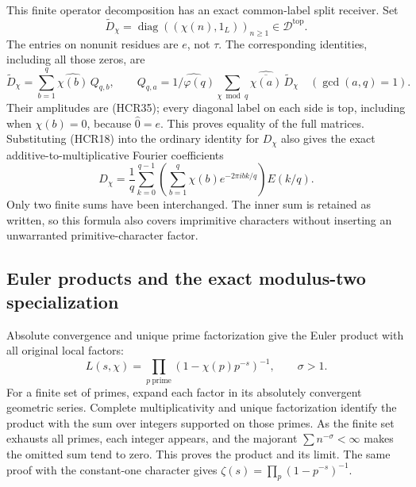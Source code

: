 This finite operator decomposition has an exact
common-label split receiver. Set
\begin{equation}\tag{HCR37}
 \widetilde D_\chi=\operatorname{diag}((\chi(n),1_L))_{n\ge1}
                       \in\mathscr D^{\mathrm{top}}.
\end{equation}
The entries on nonunit residues are $e$, not $\tau$.
The corresponding identities, including all those
zeros, are
\begin{equation}\tag{HCR38}
 \widetilde D_\chi=\sum_{b=1}^q\widehat{\chi(b)}\,Q_{q,b},
 \qquad
 Q_{q,a}=\widehat{1/\varphi(q)}
       \sum_{\chi\bmod q}\widehat{\overline{\chi(a)}}
                          \,\widetilde D_\chi
                      \quad(\gcd(a,q)=1).
\end{equation}
Their amplitudes are (HCR35); every diagonal label
on each side is top, including when $\chi(b)=0$,
because $\widehat0=e$. This proves equality of
the full matrices. Substituting (HCR18) into the
ordinary identity for $D_\chi$ also gives the exact
additive-to-multiplicative Fourier coefficients
\begin{equation}\tag{HCR39}
 D_\chi=\frac1q\sum_{k=0}^{q-1}
       \left(\sum_{b=1}^q\chi(b)e^{-2\pi i bk/q}\right)E(k/q).
\end{equation}
Only two finite sums have been interchanged. The
inner sum is retained as written, so this formula
also covers imprimitive characters without inserting
an unwarranted primitive-character factor.

\subsection{Euler products and the exact modulus-two specialization}

Absolute convergence and unique prime factorization
give the Euler product with all original local factors:
\begin{equation}\tag{HCR40}
 L(s,\chi)=\prod_{p\ \mathrm{prime}}
                  (1-\chi(p)p^{-s})^{-1},\qquad\sigma>1.
\end{equation}
For a finite set of primes, expand each factor in its
absolutely convergent geometric series. Complete
multiplicativity and unique factorization identify
the product with the sum over integers supported on
those primes. As the finite set exhausts all primes,
each integer appears, and the majorant
$\sum n^{-\sigma}<\infty$ makes the omitted sum tend
to zero. This proves the product and its limit. The
same proof with the constant-one character gives
$\zeta(s)=\prod_p(1-p^{-s})^{-1}$.

